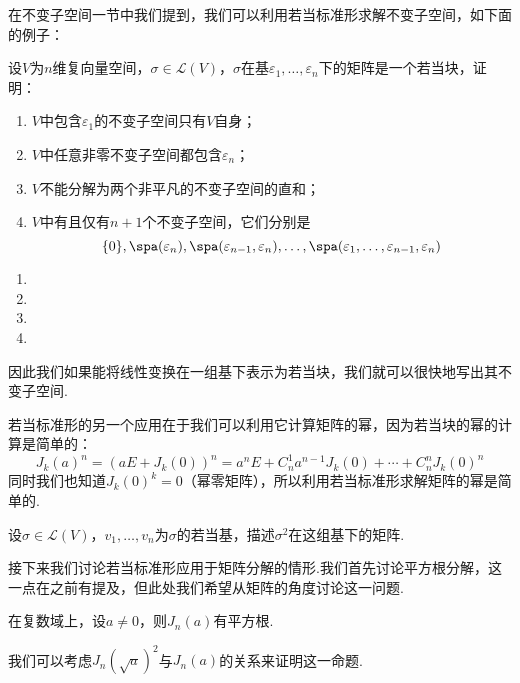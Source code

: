 在不变子空间一节中我们提到，我们可以利用若当标准形求解不变子空间，如下面的例子：
\begin{example}
    设$V$为$n$维复向量空间，$\sigma\in \mathcal{L}(V)$，$\sigma$在基$\varepsilon_1,\ldots,\varepsilon_n$下的矩阵是一个若当块，证明：
    \begin{enumerate}[label=(\arabic*)]
        \item $V$中包含$\varepsilon_1$的不变子空间只有$V$自身；

        \item $V$中任意非零不变子空间都包含$\varepsilon_n$；

        \item $V$不能分解为两个非平凡的不变子空间的直和；

        \item $V$中有且仅有$n+1$个不变子空间，它们分别是
        \[\{0\},\spa(\varepsilon_n),\spa(\varepsilon_{n-1},\varepsilon_n),\ldots,\spa(\varepsilon_1,\ldots,\varepsilon_{n-1},\varepsilon_n)\]
    \end{enumerate}
\end{example}
\begin{solution}
    \begin{enumerate}[label=(\arabic*)]
        \item 
        \item 
        \item 
        \item 
    \end{enumerate}
\end{solution}

因此我们如果能将线性变换在一组基下表示为若当块，我们就可以很快地写出其不变子空间.

若当标准形的另一个应用在于我们可以利用它计算矩阵的幂，因为若当块的幂的计算是简单的：
\[J_k(a)^n=(aE+J_k(0))^n=a^nE+C_n^1a^{n-1}J_k(0)+\cdots+C_n^nJ_k(0)^n\]
同时我们也知道$J_k(0)^k=0$（幂零矩阵），所以利用若当标准形求解矩阵的幂是简单的.
\begin{example}
    设$\sigma\in \mathcal{L}(V)$，$v_1,\ldots,v_n$为$\sigma$的若当基，描述$\sigma^2$在这组基下的矩阵.
\end{example}
\begin{solution}

\end{solution}

接下来我们讨论若当标准形应用于矩阵分解的情形.我们首先讨论平方根分解，这一点在之前有提及，但此处我们希望从矩阵的角度讨论这一问题.
\begin{theorem}
    在复数域上，设$a\neq 0$，则$J_n(a)$有平方根.
\end{theorem}
我们可以考虑$J_n(\sqrt{a})^2$与$J_n(a)$的关系来证明这一命题.


